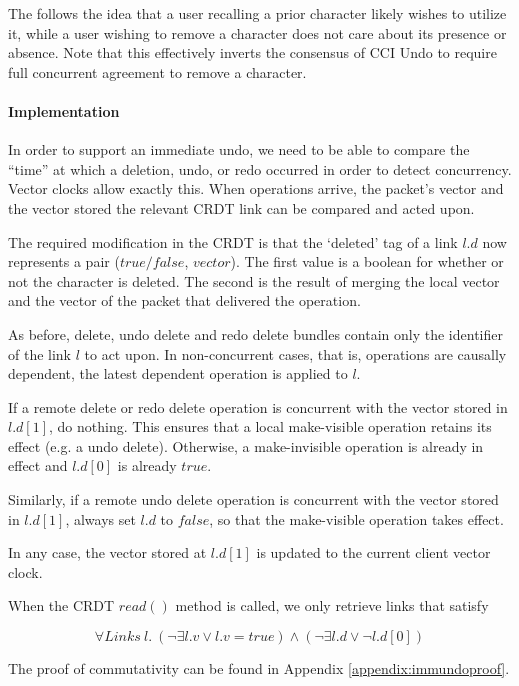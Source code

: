 \documentclass[12pt,a4paper,twoside,openright]{report}
\begin{document}
			The follows the idea that a user recalling a prior character likely wishes to utilize it, while a user wishing to remove a character does not care about its presence or absence. Note that this effectively inverts the consensus of CCI Undo to require full concurrent agreement to remove a character. 
			
			\paragraph{Implementation}
			In order to support an immediate undo, we need to be able to compare the ``time'' at which a deletion, undo, or redo occurred in order to detect concurrency. Vector clocks allow exactly this. When operations arrive, the packet's vector and the vector stored the relevant CRDT link can be compared and acted upon.
			
			The required modification in the CRDT is that the `deleted' tag of a link $l.d$ now represents a pair ($true/false$, $vector$). The first value is a boolean for whether or not the character is deleted. The second is the result of merging the local vector and the vector of the packet that delivered the operation.
			
			As before, delete, undo delete and redo delete bundles contain only the identifier of the link $l$ to act upon. In non-concurrent cases, that is, operations are causally dependent, the latest dependent operation is applied to $l$. 
			
			If a remote delete or redo delete operation is concurrent with the vector stored in $l.d[1]$, do nothing. This ensures that a local make-visible operation retains its effect (e.g. a undo delete). Otherwise, a make-invisible operation is already in effect and $l.d[0]$ is already $true$.
			
			Similarly, if a remote undo delete operation is concurrent with the vector stored in $l.d[1]$, always set $l.d$ to $false$, so that the make-visible operation takes effect.
			
			In any case, the vector stored at $l.d[1]$ is updated to the current client vector clock.
			
			When the CRDT $read()$ method is called, we only retrieve links that satisfy
			
					\[\forall Links\ l.\  (\lnot\exists l.v \lor l.v = true) \land (\lnot\exists l.d \lor \lnot l.d[0]) \] 
						
			The proof of commutativity can be found in Appendix \ref{appendix:immundoproof}.
			
\end{document}
